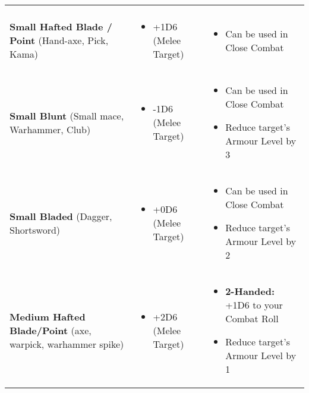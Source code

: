 \begin{center}
\begin{xltabular}{\textwidth}{|p{.25\textwidth} p{.3\textwidth} p{.35\textwidth}|}
\begin{itemize}
            \end{itemize} & \\
        \raggedright\textbf{Small Hafted Blade / Point} (Hand-axe, Pick, Kama) &
            \begin{itemize}
                \item +1D6 (Melee Target)
            \end{itemize} &
                \begin{itemize}
                    \item Can be used in Close Combat
                \end{itemize} \\
        \raggedright\textbf{Small Blunt} (Small mace, Warhammer, Club) &
            \begin{itemize}
                \item -1D6 (Melee Target)
            \end{itemize} &
                \begin{itemize}
                    \item Can be used in Close Combat
                    \item Reduce target’s Armour Level by 3
                \end{itemize} \\
        \raggedright\textbf{Small Bladed} (Dagger, Shortsword) &
            \begin{itemize}
                \item +0D6 (Melee Target)
            \end{itemize} &
                \begin{itemize}
                    \item Can be used in Close Combat
                    \item Reduce target’s Armour Level by 2
                \end{itemize} \\
        \raggedright\textbf{Medium Hafted Blade/Point} (axe, warpick, warhammer spike) &
            \begin{itemize}
                \item +2D6 (Melee Target)
            \end{itemize} &
                \begin{itemize}
                    \item \textbf{2-Handed:} +1D6 to your Combat Roll
                    \item Reduce target’s Armour Level by 1

\end{itemize}
\end{xltabular}
\end{center}
